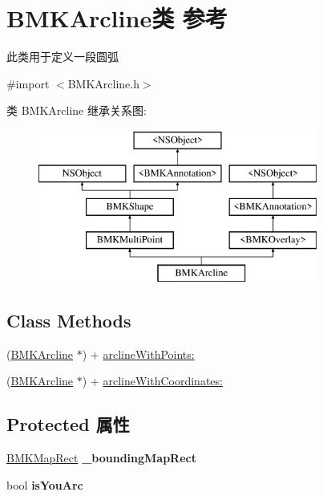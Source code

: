 \hypertarget{interface_b_m_k_arcline}{\section{B\+M\+K\+Arcline类 参考}
\label{interface_b_m_k_arcline}
}


此类用于定义一段圆弧  




{\ttfamily \#import $<$B\+M\+K\+Arcline.\+h$>$}

类 B\+M\+K\+Arcline 继承关系图\+:\begin{figure}[H]
\begin{center}
\leavevmode
\includegraphics[height=5.000000cm]{interface_b_m_k_arcline}
\end{center}
\end{figure}
\subsection*{Class Methods}
\begin{DoxyCompactItemize}
\item 
(\hyperlink{interface_b_m_k_arcline}{B\+M\+K\+Arcline} $\ast$) + \hyperlink{interface_b_m_k_arcline_ad439d6682d48b51c0b04e84772a38a79}{arcline\+With\+Points\+:}
\item 
(\hyperlink{interface_b_m_k_arcline}{B\+M\+K\+Arcline} $\ast$) + \hyperlink{interface_b_m_k_arcline_a34a5daa9fc480861aa52e2ef5b0ccb3a}{arcline\+With\+Coordinates\+:}
\end{DoxyCompactItemize}
\subsection*{Protected 属性}
\begin{DoxyCompactItemize}
\item 
\hypertarget{interface_b_m_k_arcline_abbb8f0dba8c81ab8bcd8cc8e587d51cf}{\hyperlink{struct_b_m_k_map_rect}{B\+M\+K\+Map\+Rect} {\bfseries \+\_\+bounding\+Map\+Rect}}\label{interface_b_m_k_arcline_abbb8f0dba8c81ab8bcd8cc8e587d51cf}

\item 
\hypertarget{interface_b_m_k_arcline_ae74be329c0bfedce99b890f70d3b871e}{bool {\bfseries is\+You\+Arc}}\label{interface_b_m_k_arcline_ae74be329c0bfedce99b890f70d3b871e}

\end{DoxyCompactItemize}
